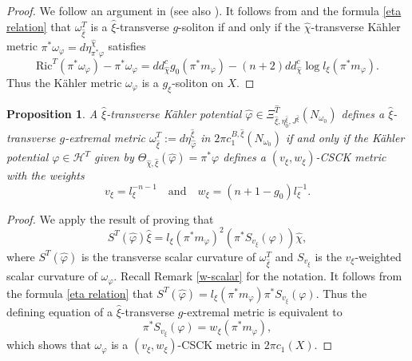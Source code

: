 \documentclass[12pt]{amsart}
\numberwithin{equation}{section}%
\theoremstyle{plain}
\newtheorem{proposition}[theorem]{Proposition}
\theoremstyle{definition}
\newcommand{\Ric}{\mathrm{Ric}}
\renewcommand{\phi}{\varphi}
\newcommand{\1}{\mathbf{1}}
\begin{document}
\begin{proof}
We follow an argument in \cite{ALL25} (see also \cite{AJL23, CL21}).
It follows from \cite[Lemma 4.3]{ALL25} and the formula
\eqref{eta relation} that
$\omega_{\hat{\xi}}^{T}$ is a $\hat{\xi}$-transverse $g$-soliton
if and only if the $\hat{\chi}$-transverse K\"ahler metric
$\pi^{*}\omega_{\phi}=d\eta_{\pi^{*}\phi}^{\hat{\chi}}$ satisfies
\begin{equation}
\Ric^{T}(\pi^{*}\omega_{\phi})-\pi^{*}\omega_{\phi}=
dd^{c}_{\hat{\chi}}g_{0}(\pi^{*}m_{\phi})
-(n+2)dd^{c}_{\hat{\chi}}\log l_{\xi}(\pi^{*}m_{\phi}).
\end{equation}
Thus the K\"ahler metric $\omega_{\phi}$ is a $g_{\xi}$-soliton on $X$.
\end{proof}

\begin{proposition}\label{reg-ext}
A $\hat{\xi}$-transverse K\"ahler potential
$\hat{\phi}\in
\Xi_{\hat{\xi},\eta^{\hat{\xi}}_{0},J^{\hat{\xi}}}^{\hat{T}}(N_{\omega_{0}})$
defines a $\hat{\xi}$-transverse $g$-extremal metric
$\omega_{\hat{\xi}}^{T}:=d\eta^{\hat{\xi}}_{\hat{\phi}}$
in $2\pi c^{B,\hat{\xi}}_{1}(N_{\omega_{0}})$
if and only if
the K\"ahler potential $\phi\in\mathcal{H}^{T}$
given by $\Theta_{\hat{\chi},\hat{\xi}}(\hat{\phi})=\pi^{*}\phi$
defines
a $(v_{\xi},w_{\xi})$-CSCK metric with the weights
\begin{equation}
v_{\xi}=l_{\xi}^{-n-1}
\quad\text{and}\quad
w_{\xi}=\left(n+1-g_{0}\right)l_{\xi}^{-1}.
\end{equation}
\end{proposition}

\begin{proof}
We apply the result of \cite[Lemma 3]{AC21} proving that
\begin{equation}
S^{T}(\hat{\phi})\hat{\xi}=
l_{\xi}(\pi^{*}m_{\phi})^{2}(\pi^{*}S_{v_{\xi}}(\phi))\hat{\chi},
\end{equation}
where $S^{T}(\hat{\phi})$ is the transverse scalar curvature of
$\omega^{T}_{\hat{\xi}}$
and $S_{v_{\xi}}$ is the $v_{\xi}$-weighted scalar curvature of
$\omega_{\phi}$.
Recall Remark \ref{w-scalar} for the notation.
It follows from the formula \eqref{eta relation}
that $S^{T}(\hat{\phi})=l_{\xi}(\pi^{*}m_{\phi})\pi^{*}S_{v_{\xi}}(\phi)$.
Thus the defining equation of a $\hat{\xi}$-transverse $g$-extremal metric
is equivalent to
\begin{equation}
\pi^{*}S_{v_{\xi}}(\phi)=w_{\xi}(\pi^{*}m_{\phi}),
\end{equation}
which shows that $\omega_{\phi}$ is a $(v_{\xi},w_{\xi})$-CSCK metric
in $2\pi c_{1}(X)$.
\end{proof}
\end{document}
